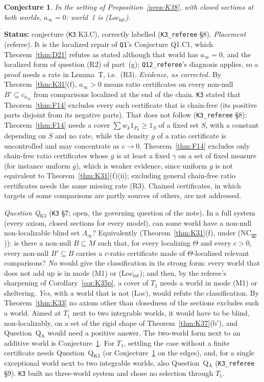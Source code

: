 \documentclass[11pt]{article}
\newtheorem{conjecture}[theorem]{Conjecture}
\theoremstyle{definition}
\theoremstyle{remark}
\newcommand{\src}[1]{\texttt{#1}}
\newcommand{\status}[1]{\par\smallskip\noindent\textbf{Status:} #1\par\smallskip}
\begin{document}
\begin{conjecture}\label{conj:K3C}
In the setting of Proposition~\ref{prop:K38}, with closed sections at both worlds, $a_\infty=0$: world~1 is (Loc$_{\mathrm{int}}$).
\end{conjecture}
\status{conjecture (\src{K3} K3.C), correctly labelled (\src{K3\_referee} \S8). \emph{Placement} (referee). It is the localized repair of \src{Q1}'s Conjecture Q1.C1, which Theorem~\ref{thm:D21} refutes as stated although that world has $a_\infty=0$, and the localized form of question (R2) of part~(g); \src{Q12\_referee}'s diagnosis applies, so a proof needs a rate in Lemma~T, i.e.\ (R3). \emph{Evidence, as corrected.} By Theorem~\ref{thm:K31}(f), $a_\infty>0$ means ratio certificates on every non-null $B'\subseteq c_{a_\infty}$ from comparisons localized at the end of the chain. \src{K3} stated that Theorem~\ref{thm:F14} excludes every such certificate that is chain-free (its positive parts disjoint from its negative parts). That does not follow (\src{K3\_referee} \S8): Theorem~\ref{thm:F14} needs a cover $\sum w_k1_{P_k}\ge1_S$ of a fixed set $S$, with a constant depending on $S$ and no rate, while the density $g$ of a ratio certificate is uncontrolled and may concentrate as $c\to0$. Theorem~\ref{thm:F14} excludes only chain-free ratio certificates whose $g$ is at least a fixed $\gamma$ on a set of fixed measure (for instance uniform $g$), which is weaker evidence, since uniform $g$ is not equivalent to Theorem~\ref{thm:K31}(f)(ii); excluding general chain-free ratio certificates needs the same missing rate (R3). Chained certificates, in which targets of some comparisons are partly sources of others, are not addressed.}

\emph{Question Q$_{\mathrm{K3}}$} (\src{K3} \S7; open, the governing question of the note). In a full system (every axiom, closed sections for every model), can some world have a non-null non-localizable blind set $\Lambda_\infty$? Equivalently (Theorem~\ref{thm:K31}(f), under (NC$_{\mathfrak W}$)): is there a non-null $B\subseteq M$ such that, for every localizing $\Theta$ and every $c>0$, every non-null $B'\subseteq B$ carries a $c$-ratio certificate made of $\Theta$-localized relevant comparisons? \emph{No} would give the classification in its strong form: every world that does not add up is in mode (M1) or (Loc$_{\mathrm{int}}$); and then, by the referee's sharpening of Corollary~\ref{cor:K35p}, a cover of $T_1$ needs a world in mode (M1) or sheltering. \emph{Yes}, with a world that is not (Loc), would refute the classification. By Theorem~\ref{thm:K33} no axiom other than closedness of the sections excludes such a world. Aimed at $T_1$ next to two integrable worlds, it would have to be blind, non-localizably, on a set of the rigid shape of Theorem~\ref{thm:K37}(b$'$), and Question~Q$_{\mathrm A}$ would need a positive answer. The two-world form next to an additive world is Conjecture~\ref{conj:K3C}. For $T_1$, settling the case without a finite certificate needs Question~Q$_{\mathrm{K3}}$ (or Conjecture~\ref{conj:K3C} on the edges), and, for a single exceptional world next to two integrable worlds, also Question~Q$_{\mathrm A}$ (\src{K3\_referee} \S9). \src{K3} built no three-world system and chose no selection through $T_1$.
\end{document}
